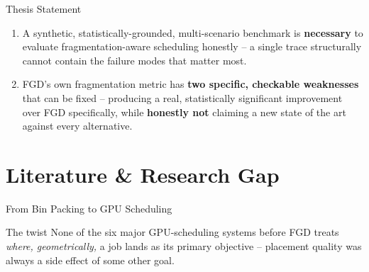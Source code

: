 \documentclass[aspectratio=169]{beamer}
\begin{document}
\begin{frame}{Thesis Statement}
\begin{enumerate}
  \item[\textbf{1.}] A synthetic, statistically-grounded, multi-scenario
    benchmark is \textbf{necessary} to evaluate fragmentation-aware
    scheduling honestly -- a single trace structurally cannot contain the
    failure modes that matter most.
  \vspace{0.3cm}
  \item[\textbf{2.}] FGD's own fragmentation metric has \textbf{two
    specific, checkable weaknesses} that can be fixed -- producing a real,
    statistically significant improvement over FGD specifically, while
    \textbf{honestly not} claiming a new state of the art against every
    alternative.
\end{enumerate}
\end{frame}

\section{Literature \& Research Gap}
\begin{frame}{From Bin Packing to GPU Scheduling}
\centering
{}

\vspace{0.5cm}
\begin{block}{The twist}
None of the six major GPU-scheduling systems before FGD treats
\emph{where, geometrically,} a job lands as its primary objective --
placement quality was always a side effect of some other goal.
\end{block}
\end{frame}
\end{document}
